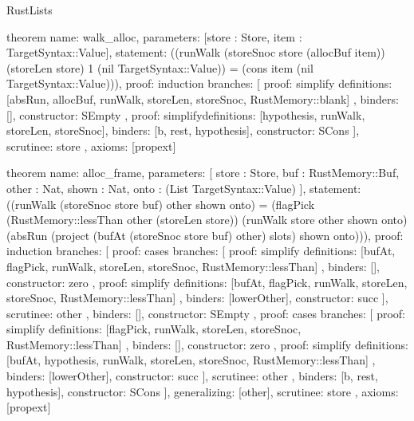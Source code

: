 \begin{lexlean}{RustLists}
\begin{semanticmodule}
theorem{
  name: walk_alloc,
  parameters: [store : Store, item : TargetSyntax::Value],
  statement: ((runWalk (storeSnoc store (allocBuf item)) (storeLen store) 1 (nil TargetSyntax::Value)) = (cons item (nil TargetSyntax::Value))),
  proof: induction{
    branches: [
      {
        proof: simplify{
          definitions: [absRun, allocBuf, runWalk, storeLen, storeSnoc, RustMemory::blank]
        },
        binders: [],
        constructor: SEmpty
      },
      {
        proof: simplify{definitions: [hypothesis, runWalk, storeLen, storeSnoc]},
        binders: [b, rest, hypothesis],
        constructor: SCons
      }
    ],
    scrutinee: store
  },
  axioms: [propext]
}

theorem{
  name: alloc_frame,
  parameters: [
    store : Store,
    buf : RustMemory::Buf,
    other : Nat,
    shown : Nat,
    onto : (List TargetSyntax::Value)
  ],
  statement: ((runWalk (storeSnoc store buf) other shown onto) = (flagPick (RustMemory::lessThan other (storeLen store)) (runWalk store other shown onto) (absRun (project (bufAt (storeSnoc store buf) other) slots) shown onto))),
  proof: induction{
    branches: [
      {
        proof: cases{
          branches: [
            {
              proof: simplify{
                definitions: [bufAt, flagPick, runWalk, storeLen, storeSnoc, RustMemory::lessThan]
              },
              binders: [],
              constructor: zero
            },
            {
              proof: simplify{
                definitions: [bufAt, flagPick, runWalk, storeLen, storeSnoc, RustMemory::lessThan]
              },
              binders: [lowerOther],
              constructor: succ
            }
          ],
          scrutinee: other
        },
        binders: [],
        constructor: SEmpty
      },
      {
        proof: cases{
          branches: [
            {
              proof: simplify{
                definitions: [flagPick, runWalk, storeLen, storeSnoc, RustMemory::lessThan]
              },
              binders: [],
              constructor: zero
            },
            {
              proof: simplify{
                definitions: [bufAt, hypothesis, runWalk, storeLen, storeSnoc, RustMemory::lessThan]
              },
              binders: [lowerOther],
              constructor: succ
            }
          ],
          scrutinee: other
        },
        binders: [b, rest, hypothesis],
        constructor: SCons
      }
    ],
    generalizing: [other],
    scrutinee: store
  },
  axioms: [propext]
}


\end{semanticmodule}
\end{lexlean}
